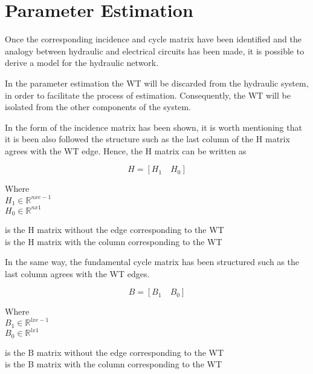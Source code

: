 \section{Parameter Estimation}  
\label{ParameterEstimation}
Once the corresponding incidence and cycle matrix have been identified and the analogy between hydraulic and
electrical circuits has been made, it is possible to derive a model for the hydraulic network. 

In the parameter estimation the WT will be discarded from the hydraulic system, 
in order to facilitate the process of estimation. Consequently, the WT will be isolated from the other components of the
system.  

In  the form of the incidence matrix has been shown, it 
is worth mentioning that it is been also followed the structure such as the last 
column of the H matrix agrees with the WT edge. Hence, the H matrix can 
be written as

\begin {equation}
H = [H_1 \quad H_0]
\end{equation}

\begin{minipage}[t]{0.20\textwidth}
Where\\
\hspace*{7mm} $H_1 \in \mathbb{R}^{nxe-1}$  \\
\hspace*{7mm} $H_0 \in \mathbb{R}^{nx1} $ 
\end{minipage}
\begin{minipage}[t]{0.68\textwidth}
\vspace*{2mm}
\hspace*{4mm} is the H matrix without the edge corresponding to the WT\\
\hspace*{4mm} is the H matrix with the column corresponding to the WT 
\end{minipage}

In the same way, the fundamental cycle matrix has been structured such as the last column agrees with the WT edges.

\begin{equation}
  B = [B_1 \quad B_0]
\end{equation} 

\begin{minipage}[t]{0.20\textwidth}
Where\\
\hspace*{8mm} $B_1 \in \mathbb{R}^{lxe-1}$  \\
\hspace*{8mm} $B_0 \in \mathbb{R}^{lx1} $ 
\end{minipage}
\begin{minipage}[t]{0.68\textwidth}
\vspace*{2mm}
\hspace*{4mm} is the B matrix without the edge corresponding to the WT\\
\hspace*{4mm} is the B matrix with the column corresponding to the WT 
\end{minipage}

